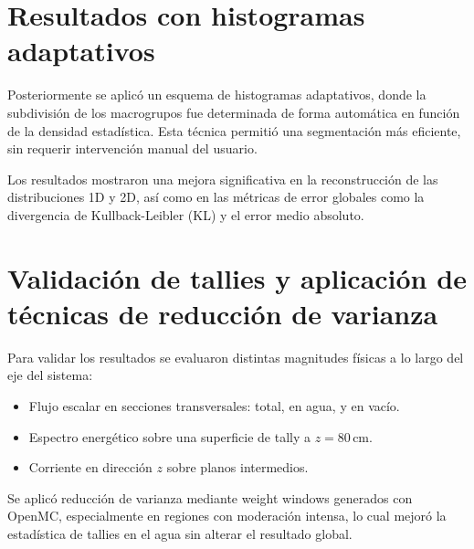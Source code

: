 \section{Resultados con histogramas adaptativos}

Posteriormente se aplicó un esquema de histogramas adaptativos, donde la subdivisión de los macrogrupos fue determinada de forma automática en función de la densidad estadística. Esta técnica permitió una segmentación más eficiente, sin requerir intervención manual del usuario.

Los resultados mostraron una mejora significativa en la reconstrucción de las distribuciones 1D y 2D, así como en las métricas de error globales como la divergencia de Kullback-Leibler (KL) y el error medio absoluto.


\section{Validación de tallies y aplicación de técnicas de reducción de varianza}

Para validar los resultados se evaluaron distintas magnitudes físicas a lo largo del eje del sistema:

\begin{itemize}
    \item Flujo escalar en secciones transversales: total, en agua, y en vacío.
    \item Espectro energético sobre una superficie de tally a $z = 80\,\text{cm}$.
    \item Corriente en dirección $z$ sobre planos intermedios.
\end{itemize}

Se aplicó reducción de varianza mediante weight windows generados con OpenMC, especialmente en regiones con moderación intensa, lo cual mejoró la estadística de tallies en el agua sin alterar el resultado global.


